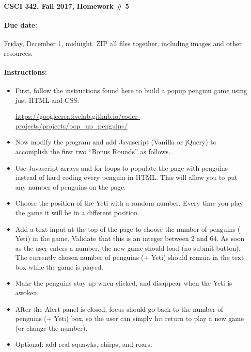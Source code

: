 \documentclass{article}
\newcommand{\myitem}{\paragraph}
\begin{document}
\myitem{CSCI 342, Fall 2017, Homework \# 5}

\myitem{Due date:}  Friday, December 1, midnight.  ZIP all files
together, including images and other resources.

\myitem{Instructions:}

\begin{itemize}
\item
First, follow the instructions found here to build a popup penguin game
using just HTML and CSS:

\centerline{\url{https://googlecreativelab.github.io/coder-projects/projects/pop_up_penguins/}}

\item Now modify the program and add Javascript (Vanilla or jQuery)
  to accomplish the first two ``Bonus Rounds'' as follows.

\item Use Javascript arrays and for-loops to populate the page with
  penguins instead of hard coding every penguin in HTML.  This will
  allow you to put any number of penguins on the page.

\item Choose the position of the Yeti with a random number.  Every
  time you play the game it will be in a different position.
  
\item Add a text input at the top of the page to choose the number of
  penguins (+ Yeti) in the game.  Validate that this is an integer between 2
  and 64.  As soon as the user enters a number, the new game should
  load (no submit button).  The currently chosen number of penguins (+
  Yeti)  should remain in the text box while the game is played.

\item Make the penguins stay up when clicked, and disappear when the
  Yeti is awoken.

\item After the Alert panel is closed, focus should go back to the
  number of penguins (+ Yeti) box, so the user can simply hit return
  to play a new game (or change the number).

\item Optional:  add real squawks, chirps, and roars.  

\end{itemize}
\end{document}
